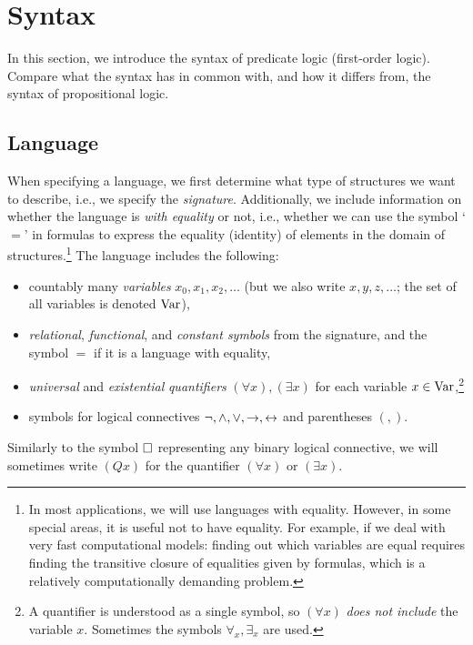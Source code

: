 \section{Syntax}

In this section, we introduce the syntax of predicate logic (first-order logic). Compare what the syntax has in common with, and how it differs from, the syntax of propositional logic.


\subsection{Language}

When specifying a language, we first determine what type of structures we want to describe, i.e., we specify the \emph{signature}. Additionally, we include information on whether the language is \emph{with equality} or not, i.e., whether we can use the symbol `$=$' in formulas to express the equality (identity) of elements in the domain of structures.\footnote{In most applications, we will use languages with equality. However, in some special areas, it is useful not to have equality. For example, if we deal with very fast computational models: finding out which variables are equal requires finding the transitive closure of equalities given by formulas, which is a relatively computationally demanding problem.} The language includes the following:
\begin{itemize}
    \item countably many \emph{variables} $x_0,x_1,x_2,\dots$ (but we also write $x,y,z,\dots$; the set of all variables is denoted $\operatorname{Var}$),
    \item \emph{relational}, \emph{functional}, and \emph{constant symbols} from the signature, and the symbol $=$ if it is a language with equality,
    \item \emph{universal} and \emph{existential} \emph{quantifiers} $(\forall x),(\exists x)$ for each variable $x\in\operatorname{Var}$,\footnote{A quantifier is understood as a single symbol, so $(\forall x)$ \emph{does not include} the variable $x$. Sometimes the symbols $\forall_x,\exists_x$ are used.}
    \item symbols for logical connectives \( \neg,{\land},{\lor}, {\mathbin{\rightarrow}}, {\mathbin{\leftrightarrow}} \) and parentheses \( (,) \).
\end{itemize}
Similarly to the symbol ${\mathbin{\square}}$ representing any binary logical connective, we will sometimes write $(Qx)$ for the quantifier $(\forall x)$ or $(\exists x)$.

